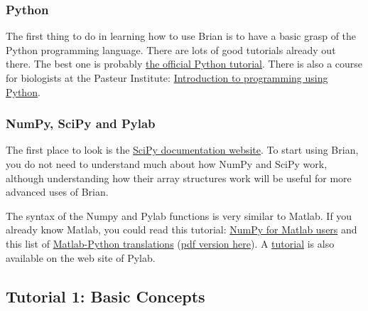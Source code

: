 \documentclass[letterpaper,10pt,english]{manual}
\begin{document}
\subsubsection{Python}

The first thing to do in learning how to use Brian
is to have a basic grasp of the Python programming language.
There are lots of good tutorials already out there. The best one is probably
\href{http://docs.python.org/tut/}{the official Python tutorial}.
There is also a course for biologists at the Pasteur Institute:
\href{http://www.pasteur.fr/formation/infobio/python/}{Introduction to programming using Python}.


\subsubsection{NumPy, SciPy and Pylab}

The first place to look is the \href{http://docs.scipy.org/doc/}{SciPy documentation website}. To start using Brian, you do not need
to understand much about how NumPy and SciPy work, although understanding how their
array structures work will be useful for more advanced uses of Brian.

The syntax of the Numpy and Pylab functions is very similar to Matlab.
If you already know Matlab, you could read this tutorial:
\href{http://scipy.org/NumPy\_for\_Matlab\_Users}{NumPy for Matlab users}
and this list of \href{http://mathesaurus.sourceforge.net/}{Matlab-Python translations}
(\href{http://brian.di.ens.fr/matlab-python-xref.pdf}{pdf version here}).
A \href{http://matplotlib.sourceforge.net/tutorial.html}{tutorial} is also available on
the web site of Pylab.

\resetcurrentobjects


\hypertarget{tutorial1-basic-concepts}{}\subsection{Tutorial 1: Basic Concepts}
\end{document}
